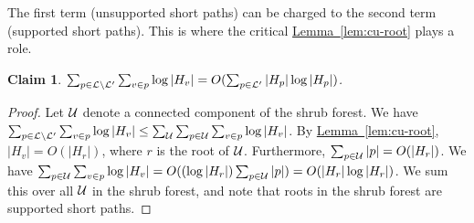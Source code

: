 \documentclass[11pt]{article}
\newtheorem{claim}[theorem]{Claim}
\theoremstyle{definition}
\newcommand{\cL}{{\cal L}}
\newcommand{\cU}{{\cal U}}
\newcommand{\Lem}[1]{\hyperref[lem:#1]{Lemma~\ref*{lem:#1}}} %
\begin{document}
The first term (unsupported short paths) can be charged to the second term (supported short paths).
This is where the critical \Lem{cu-root} plays a role.

\begin{claim} \label{clm:first} $\sum_{p \in \cL \setminus \cL'} \sum_{v \in p} \log |H_v| = O(\sum_{p \in \cL'} |H_p| \log |H_p|)$.
\end{claim}

\begin{proof} Let $\cU$ denote a connected component of the shrub forest.
We have $\sum_{p \in \cL \setminus \cL'} \sum_{v \in p} \log |H_v| \leq \sum_{\cU} \sum_{p \in \cU} \sum_{v \in p} \log |H_v|$.
By \Lem{cu-root}, $|H_v| = O(|H_r|)$, where $r$ is the root of $\cU$.
Furthermore, $\sum_{p \in \cU} |p| = O(|H_r|)$. 
We have $\sum_{p \in \cU} \sum_{v \in p} \log |H_v| = O((\log |H_r|) \sum_{p \in \cU} |p|) = O(|H_r|\log |H_r|)$.
We sum this over all $\cU$ in the shrub forest, and note that roots in the shrub forest are supported short paths.
\end{proof}
\end{document}
